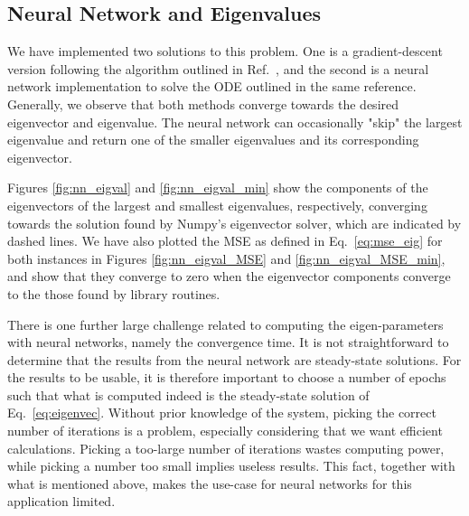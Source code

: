 \documentclass[a4paper, 
amsfonts, 
amssymb, 
amsmath, 
reprint, 
showkeys, 
nofootinbib, 
twoside]{revtex4-2}
\begin{document}
\subsection{Neural Network and Eigenvalues}

We have implemented two solutions to this problem. One is a gradient-descent version following the algorithm outlined in Ref.~, and the second is a neural network implementation to solve the ODE outlined in the same reference. Generally, we observe that both methods converge towards the desired eigenvector and eigenvalue. The neural network can occasionally "skip" the largest eigenvalue and return one of the smaller eigenvalues and its corresponding eigenvector.  

Figures \ref{fig:nn_eigval} and \ref{fig:nn_eigval_min} show the components of the eigenvectors of the largest and smallest eigenvalues, respectively, converging towards the solution found by Numpy's eigenvector solver, which are indicated by dashed lines. We have also plotted the MSE as defined in Eq.~\eqref{eq:mse_eig} for both instances in Figures \ref{fig:nn_eigval_MSE} and \ref{fig:nn_eigval_MSE_min}, and show that they converge to zero when the eigenvector components converge to the those found by library routines. 

There is one further large challenge related to computing the eigen-parameters with neural networks, namely the convergence time. It is not straightforward to determine that the results from the neural network are steady-state solutions. For the results to be usable, it is therefore important to choose a number of epochs such that what is computed indeed is the steady-state solution of Eq.~\eqref{eq:eigenvec}. Without prior knowledge of the system, picking the correct number of iterations is a problem, especially considering that we want efficient calculations. Picking a too-large number of iterations wastes computing power, while picking a number too small implies useless results. This fact, together with what is mentioned above, makes the use-case for neural networks for this application limited.  
\end{document}
